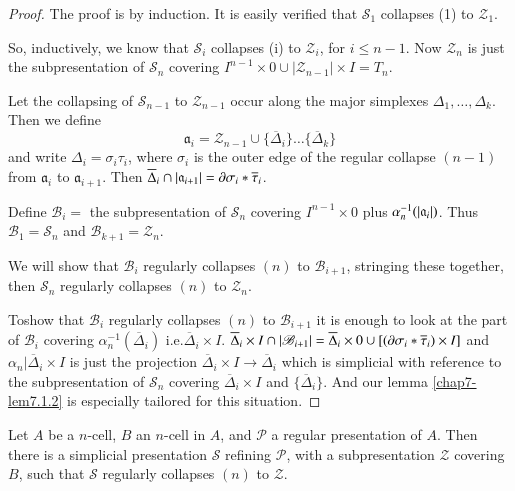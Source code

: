 \begin{proof}
The proof is by induction. It is easily verified that $\mathscr{S}_{1}$ collapses (1) to $\mathscr{Z}_{1}$.

So, inductively, we know that $\mathscr{S}_{i}$ collapses (i) to $\mathscr{Z}_{i}$, for $i\leq n-1$. Now $\mathscr{Z}_{n}$ is just the subpresentation of $\mathscr{S}_{n}$ covering $I^{n-1}\times 0\cup |\mathscr{Z}_{n-1}|\times I=T_{n}$.

Let the collapsing of $\mathscr{S}_{n-1}$ to $\mathscr{Z}_{n-1}$ occur along the major simplexes $\Delta_{1},\ldots,\Delta_{k}$. Then we define
$$
\mathfrak{a}_{i}=\mathscr{Z}_{n-1}\cup \{\overline{\Delta}_{i}\}\ldots \{\overline{\Delta}_{k}\}
$$
and write $\Delta_{i}=\sigma_{i}\tau_{i}$, where $\sigma_{i}$ is the outer edge of the regular collapse $(n-1)$ from $\mathfrak{a}_{i}$ to $\mathfrak{a}_{i+1}$. Then $\overline{\Delta}_{i}\cap |\mathfrak{a}_{i+1}|=\partial \sigma_{i}\ast \overline{\tau}_{i}$.

Define $\mathscr{B}_{i}=$ the subpresentation of $\mathscr{S}_{n}$
covering $I^{n-1}\times 0$ plus
$\alpha^{-1}_{n}\break(|\mathfrak{a}_{i}|)$. Thus
$\mathscr{B}_{1}=\mathscr{S}_{n}$ and
$\mathscr{B}_{k+1}=\mathscr{Z}_{n}$. 

We will show that $\mathscr{B}_{i}$ regularly collapses $(n)$ to $\mathscr{B}_{i+1}$, stringing these together, then $\mathscr{S}_{n}$ regularly collapses $(n)$ to $\mathscr{Z}_{n}$.

To\pageoriginale show that $\mathscr{B}_{i}$ regularly collapses $(n)$ to $\mathscr{B}_{i+1}$ it is enough to look at the part of $\mathscr{B}_{i}$ covering $\alpha^{-1}_{n}(\overline{\Delta}_{i})$ i.e.\@ $\overline{\Delta}_{i}\times I$. $\overline{\Delta}_{i}\times I\cap |\mathscr{B}_{i+1}|=\overline{\Delta}_{i}\times 0\cup [(\partial \sigma_{i}\ast \overline{\tau}_{i})\times I]$ and $\alpha_{n}|\overline{\Delta}_{i}\times I$ is just the projection $\overline{\Delta}_{i}\times I\to \overline{\Delta}_{i}$ which is simplicial with reference to the subpresentation of $\mathscr{S}_{n}$ covering $\overline{\Delta}_{i}\times I$ and $\{\overline{\Delta}_{i}\}$. And our lemma \ref{chap7-lem7.1.2} is especially tailored for this situation.
\end{proof}

\setcounter{proposition}{3}
\begin{theorem}\label{chap7-thm7.1.4}
Let $A$ be a $n$-cell, $B$ an $n$-cell in $A$, and $\mathscr{P}$ a regular presentation of $A$. Then there is a simplicial presentation $\mathscr{S}$ refining $\mathscr{P}$, with a subpresentation $\mathscr{Z}$ covering $B$, such that $\mathscr{S}$ regularly collapses $(n)$ to $\mathscr{Z}$.
\end{theorem}

